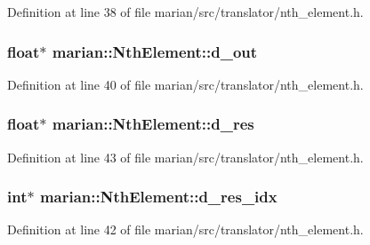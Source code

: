 Definition at line 38 of file marian/src/translator/nth\+\_\+element.\+h.

\subsubsection[{\texorpdfstring{d\+\_\+out}{d_out}}]{\setlength{\rightskip}{0pt plus 5cm}float$\ast$ marian\+::\+Nth\+Element\+::d\+\_\+out\hspace{0.3cm}{\ttfamily [private]}}\hypertarget{classmarian_1_1NthElement_af19e2b5ded5b809af4cd3d7ae5fabd76}{}\label{classmarian_1_1NthElement_af19e2b5ded5b809af4cd3d7ae5fabd76}


Definition at line 40 of file marian/src/translator/nth\+\_\+element.\+h.

\subsubsection[{\texorpdfstring{d\+\_\+res}{d_res}}]{\setlength{\rightskip}{0pt plus 5cm}float$\ast$ marian\+::\+Nth\+Element\+::d\+\_\+res\hspace{0.3cm}{\ttfamily [private]}}\hypertarget{classmarian_1_1NthElement_abac41ccdf9479bde12bf6d801e89e704}{}\label{classmarian_1_1NthElement_abac41ccdf9479bde12bf6d801e89e704}


Definition at line 43 of file marian/src/translator/nth\+\_\+element.\+h.

\subsubsection[{\texorpdfstring{d\+\_\+res\+\_\+idx}{d_res_idx}}]{\setlength{\rightskip}{0pt plus 5cm}int$\ast$ marian\+::\+Nth\+Element\+::d\+\_\+res\+\_\+idx\hspace{0.3cm}{\ttfamily [private]}}\hypertarget{classmarian_1_1NthElement_a902de96295f9d6d6af55b4a3a30fe713}{}\label{classmarian_1_1NthElement_a902de96295f9d6d6af55b4a3a30fe713}


Definition at line 42 of file marian/src/translator/nth\+\_\+element.\+h.

